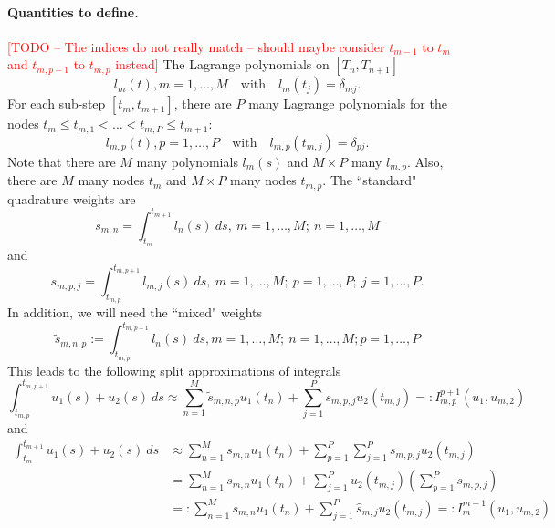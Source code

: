 \documentclass{article}
\newcommand{\todo}[1]{\textcolor{red}{[TODO -- #1]}}
\begin{document}
\paragraph{Quantities to define.}
\todo{The indices do not really match -- should maybe consider $t_{m-1}$ to $t_m$ and $t_{m,p-1}$ to $t_{m,p}$ instead}
The Lagrange polynomials on $[T_n, T_{n+1}]$
\begin{equation}
	l_m(t), m = 1, \ldots, M \quad \text{with} \quad l_m(t_j) = \delta_{mj}.
\end{equation}
For each sub-step $[t_m, t_{m+1}]$, there are $P$ many Lagrange polynomials for the nodes $t_{m} \leq t_{m,1} < \ldots < t_{m,P} \leq t_{m+1}$:
\begin{equation}
	l_{m,p}(t), p=1, \ldots, P \quad \text{with} \quad l_{m,p}(t_{m,j}) = \delta_{pj}.
\end{equation}
Note that there are $M$ many polynomials $l_m(s)$ and $M \times P$ many $l_{m,p}$.
Also, there are $M$ many nodes $t_m$ and $M \times P$ many nodes $t_{m,p}$.
The ``standard" quadrature weights are
\begin{equation}
	s_{m,n} = \int_{t_m}^{t_{m+1}} l_n(s)~ds, \ m=1, \ldots, M; \ n=1, \ldots, M
\end{equation}
and
\begin{equation}
	s_{m,p,j} = \int_{t_{m,p}}^{t_{m,p+1}}  l_{m,j}(s)~ds, \ m=1, \ldots, M; \ p=1, \ldots, P; \ j=1, \ldots, P.
\end{equation}
In addition, we will need the ``mixed" weights
\begin{equation}
	\tilde{s}_{m,n,p} := \int_{t_{m,p}}^{t_{m,p+1}} l_{n}(s)~ds, m=1, \ldots, M; \ n=1, \ldots, M; p=1, \ldots, P
\end{equation}
This leads to the following split approximations of integrals
\begin{equation}
	\int_{t_{m,p}}^{t_{m,p+1}} u_1(s) + u_2(s)~ds \approx \sum_{n=1}^{M} \tilde{s}_{m,n,p} u_1(t_{n}) + \sum_{j=1}^{P} s_{m,p,j} u_2(t_{m,j}) =: I_{m,p}^{p+1}(u_1,u_{m,2})
\end{equation}
and
\begin{align*}
	\int_{t_m}^{t_{m+1}} u_1(s) + u_2(s)~ds &\approx \sum_{n=1}^{M} s_{m,n} u_1(t_n) + \sum_{p=1}^{P} \sum_{j=1}^{P} s_{m,p,j} u_2(t_{m,j}) \\
					&=  \sum_{n=1}^{M} s_{m,n} u_1(t_n) + \sum_{j=1}^{P} u_2(t_{m,j}) \left( \sum_{p=1}^{P} s_{m,p,j} \right) \\
					&=: \sum_{n=1}^{M} s_{m,n} u_1(t_n) + \sum_{j=1}^{P} \hat{s}_{m,j} u_2(t_{m,j}) =: I_m^{m+1}(u_1, u_{m,2})
\end{align*}
\end{document}
